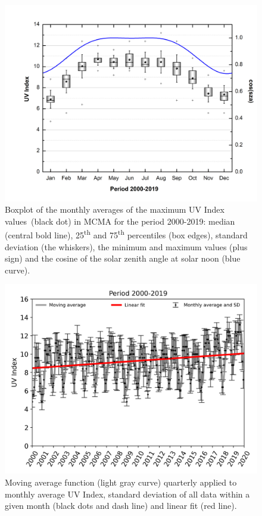 \documentclass[journal=jacsat,manuscript=article]{achemso}
\begin{document}
\begin{figure}[H]
  \begin{center}
    \includegraphics[width=0.70\columnwidth]{figures/Boxplotcos}
    \caption{{Boxplot of the monthly averages of the maximum UV Index values~(black
          dot) in MCMA for the period 2000-2019: median (central bold line),
          25\textsuperscript{th} and 75\textsuperscript{th} percentiles (box
          edges), standard deviation (the whiskers), the minimum and maximum
          values (plus sign) and the cosine of the solar zenith angle at solar
          noon (blue curve).
            {\label{310112}}%
        }}
  \end{center}
\end{figure}

\begin{figure}[H]
  \begin{center}
    \includegraphics[width=0.70\columnwidth]{figures/UV_Moving_Average}
    \caption{{Moving average function (light gray curve) quarterly applied to monthly
          average UV Index, standard deviation of all data within a given month
          (black dots and dash line) and linear fit (red line).
            {\label{185758}}%
        }}
  \end{center}
\end{figure}
\end{document}
